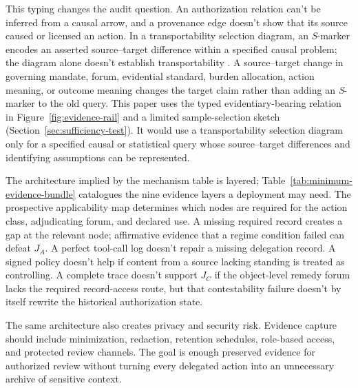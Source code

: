 This typing changes the audit question. An authorization relation can't be inferred from a causal arrow, and a provenance edge doesn't show that its source caused or licensed an action. In a transportability selection diagram, an \emph{S}-marker encodes an asserted source--target difference within a specified causal problem; the diagram alone doesn't establish transportability \citep{pearlBareinboim2014externalValidity}. A source--target change in governing mandate, forum, evidential standard, burden allocation, action meaning, or outcome meaning changes the target claim rather than adding an \emph{S}-marker to the old query. This paper uses the typed evidentiary-bearing relation in Figure~\ref{fig:evidence-rail} and a limited sample-selection sketch (Section~\ref{sec:sufficiency-test}). It would use a transportability selection diagram only for a specified causal or statistical query whose source--target differences and identifying assumptions can be represented.

The architecture implied by the mechanism table is layered; Table~\ref{tab:minimum-evidence-bundle} catalogues the nine evidence layers a deployment may need. The prospective applicability map determines which nodes are required for the action class, adjudicating forum, and declared use. A missing required record creates a gap at the relevant node; affirmative evidence that a regime condition failed can defeat \(J_A\). A perfect tool-call log doesn't repair a missing delegation record. A signed policy doesn't help if content from a source lacking standing is treated as controlling. A complete trace doesn't support \(J_C\) if the object-level remedy forum lacks the required record-access route, but that contestability failure doesn't by itself rewrite the historical authorization state.

The same architecture also creates privacy and security risk. Evidence capture should include minimization, redaction, retention schedules, role-based access, and protected review channels. The goal is enough preserved evidence for authorized review without turning every delegated action into an unnecessary archive of sensitive context.
